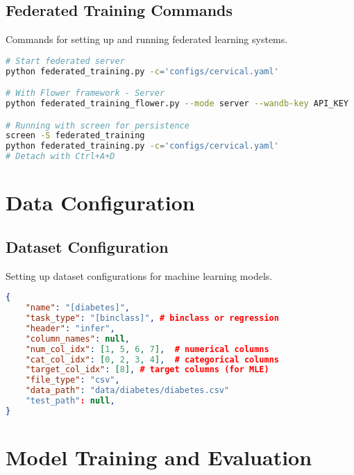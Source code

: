 \documentclass{article}
\begin{document}
\subsection{Federated Training Commands}
Commands for setting up and running federated learning systems.

\begin{tcolorbox}[colback=cyan!5!white, colframe=cyan!75!black, title=Federated Learning Setup]
\begin{lstlisting}[language=bash]
# Start federated server
python federated_training.py -c='configs/cervical.yaml'

# With Flower framework - Server
python federated_training_flower.py --mode server --wandb-key API_KEY

# Running with screen for persistence
screen -S federated_training
python federated_training.py -c='configs/cervical.yaml'
# Detach with Ctrl+A+D
\end{lstlisting}
\end{tcolorbox}

\section{Data Configuration}

\subsection{Dataset Configuration}
Setting up dataset configurations for machine learning models.

\begin{tcolorbox}[colback=gray!5!white, colframe=gray!75!black, title=Dataset Configuration Example]
\begin{lstlisting}[language=json]
{
    "name": "[diabetes]",
    "task_type": "[binclass]", # binclass or regression
    "header": "infer",
    "column_names": null,
    "num_col_idx": [1, 5, 6, 7],  # numerical columns
    "cat_col_idx": [0, 2, 3, 4],  # categorical columns
    "target_col_idx": [8], # target columns (for MLE)
    "file_type": "csv",
    "data_path": "data/diabetes/diabetes.csv"
    "test_path": null,
}
\end{lstlisting}
\end{tcolorbox}

\section{Model Training and Evaluation}
\end{document}
